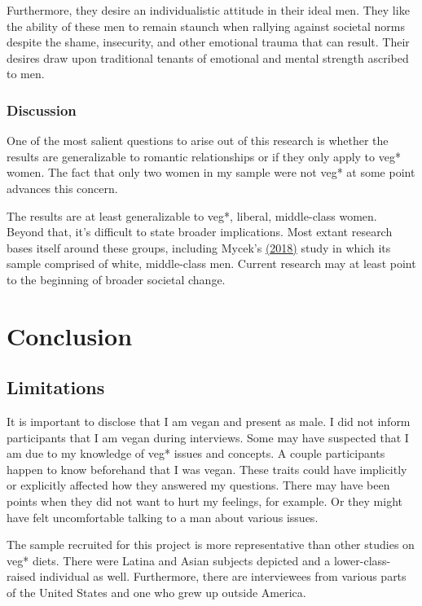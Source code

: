 \documentclass[twoside]{report}
\let\oldsection\section
\renewcommand\section{\clearpage\oldsection}
\begin{document}
\begin{multicols}{2}
Furthermore, they desire an individualistic attitude in their ideal men. They like the ability of these men to remain staunch when rallying against societal norms despite the shame, insecurity, and other emotional trauma that can result. Their desires draw upon traditional tenants of emotional and
mental strength ascribed to men.

\subsubsection{Discussion}

One of the most salient questions to arise out of this research is
whether the results are generalizable to romantic relationships or if
they only apply to veg* women. The fact that only two women in my sample
were not veg* at some point advances this concern.

The results are at least generalizable to veg*, liberal, middle-class
women. Beyond that, it's difficult to state broader implications. Most extant
research bases itself around these groups, including Mycek's \hyperlink{mycek}{(2018)} study in which its sample comprised of white, middle-class men. Current research may at least point to the beginning of broader societal change.

\section{Conclusion}
\subsection{Limitations}

It is important to disclose that I am vegan and present as male.
I did not inform participants that I am vegan during interviews. Some
may have suspected that I am due to my knowledge of veg* issues and
concepts. A couple participants happen to know beforehand that I was
vegan. These traits could have implicitly or explicitly affected how they answered my questions. There may have been points when they did not want to hurt my feelings, for example. Or they might have felt uncomfortable talking to a man about various issues.

The sample recruited for this project is more representative than other
studies on veg* diets. There were Latina and Asian subjects depicted and
a lower-class-raised individual as well. Furthermore, there are
interviewees from various parts of the United States and one
who grew up outside America.


\end{multicols}
\end{document}
